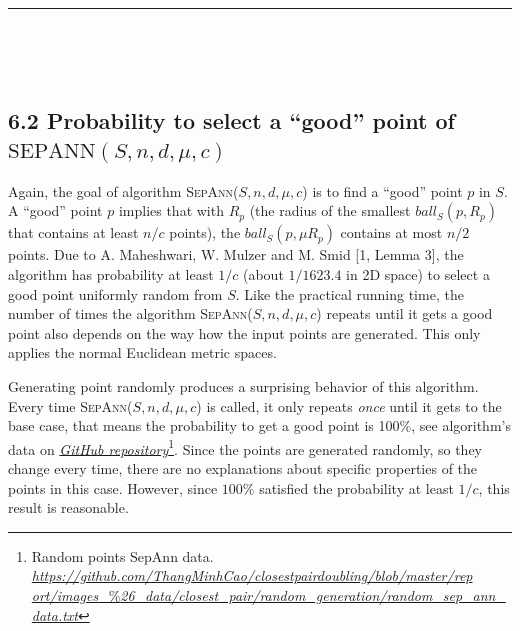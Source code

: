 \documentclass[12pt,english,]{article}
\newcommand{\pnt}[1]{{\scriptstyle#1}}
\begin{document}
\hrule

~

~

\hypertarget{section6.2}{%
\subsection{\texorpdfstring{6.2 Probability to select a ``good'' point
of
\(\mathrm{S\pnt{EP}A\pnt{NN}}(S,n,d,\mu,c)\)}{6.2 Probability to select a ``good'' point of \textbackslash{}mathrm\{S\textbackslash{}pnt\{EP\}A\textbackslash{}pnt\{NN\}\}(S,n,d,\textbackslash{}mu,c)}}\label{section6.2}}

Again, the goal of algorithm \textsc{SepAnn($S,n,d,\mu,c$)} is to find a
``good'' point \(p\) in \(S\). A ``good'' point \(p\) implies that with
\(R_p\) (the radius of the smallest \(ball_S(p,R_p)\) that contains at
least \(n/c\) points), the \(ball_S(p,\mu R_p)\) contains at most
\(n/2\) points. Due to A. Maheshwari, W. Mulzer and M. Smid {[}1, Lemma
3{]}, the algorithm has probability at least \(1/c\) (about \(1/1623.4\)
in 2D space) to select a good point uniformly random from \(S\). Like
the practical running time, the number of times the algorithm
\textsc{SepAnn($S,n,d,\mu,c$)} repeats until it gets a good point also
depends on the way how the input points are generated. This only applies
the normal Euclidean metric spaces.

Generating point randomly produces a surprising behavior of this
algorithm. Every time \textsc{SepAnn($S,n,d,\mu,c$)} is called, it only
repeats \emph{once} until it gets to the base case, that means the
probability to get a good point is 100\%, see algorithm's data on
\href{https://github.com/ThangMinhCao/closestpairdoubling/blob/master/report/images_\%26_data/closest_pair/random_generation/random_sep_ann_data.txt}{\emph{GitHub
repository}}\footnote{Random points SepAnn data.
  \href{https://github.com/ThangMinhCao/closestpairdoubling/blob/master/report/images_\%26_data/closest_pair/random_generation/random_sep_ann_data.txt}{\emph{https://github.com/ThangMinhCao/closestpairdoubling/blob/master/rep
  ort/images}\_\%\emph{26\_data/closest\_pair/random\_generation/random\_sep\_ann\_data.txt}}}.
Since the points are generated randomly, so they change every time,
there are no explanations about specific properties of the points in
this case. However, since \(100\%\) satisfied the probability at least
\(1/c\), this result is reasonable.
\end{document}
